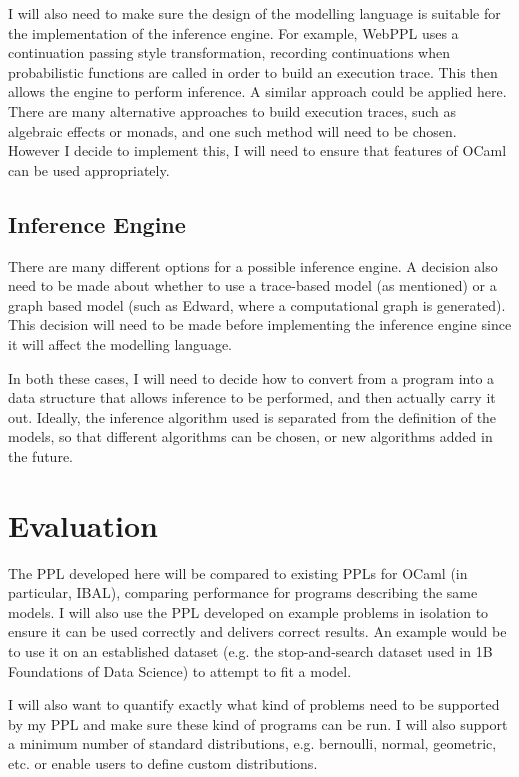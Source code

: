 I will also need to make sure the design of the modelling language is suitable for the implementation of the inference engine. For example, WebPPL\cite{mobus2018structure} uses a continuation passing style transformation, recording continuations when probabilistic functions are called in order to build an execution trace. This then allows the engine to perform inference. A similar approach could be applied here. There are many alternative approaches to build execution traces, such as algebraic effects\cite{DBLP:journals/corr/abs-1811-06150} or monads\cite{scibior2015practical}, and one such method will need to be chosen. However I decide to implement this, I will need to ensure that features of OCaml can be used appropriately.

\subsection*{Inference Engine}
There are many different options for a possible inference engine. A decision also need to be made about whether to use a trace-based model (as mentioned) or a graph based model (such as Edward, where a computational graph is generated). This decision will need to be made before implementing the inference engine since it will affect the modelling language.

In both these cases, I will need to decide how to convert from a program into a data structure that allows inference to be performed, and then actually carry it out. Ideally, the inference algorithm used is separated from the definition of the models, so that different algorithms can be chosen, or new algorithms added in the future.

\section*{Evaluation}

The PPL developed here will be compared to existing PPLs for OCaml (in particular, IBAL), comparing performance for programs describing the same models. I will also use the PPL developed on example problems in isolation to ensure it can be used correctly and delivers correct results. An example would be to use it on an established dataset (e.g. the stop-and-search dataset used in 1B Foundations of Data Science) to attempt to fit a model.

I will also want to quantify exactly what kind of problems need to be supported by my PPL and make sure these kind of programs can be run. I will also support a minimum number of standard distributions, e.g. bernoulli, normal, geometric, etc. or enable users to define custom distributions.

